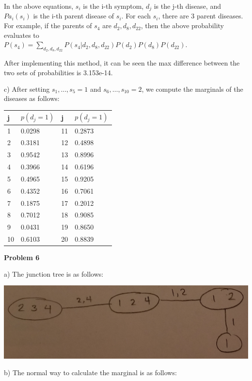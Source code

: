 \documentclass[12pt]{article}
\begin{document}
In the above equations, $s_i$ is the i-th symptom, $d_j$ is the j-th disease, and $Pa_i(s_i)$ is the i-th parent disease of $s_i$. For each $s_i$, there are 3 parent diseases. For example, if the parents of $s_4$ are $d_2, d_8, d_{22}$, then the above probability evaluates to \\$P(s_4) = \sum_{d_2, d_8, d_{22}} P(s_4 \vert d_2, d_8, d_{22})P(d_2)P(d_8)P(d_{22})$.

After implementing this method, it can be seen the max difference between the two sets of probabilities is 3.153e-14.

\pagebreak c) After setting $s_1, \dots, s_5 = 1$ and $s_6, \dots, s_{10} = 2$, we compute the marginals of the diseases as follows:

\begin{table}[h]
	\begin{tabular}{|l|l|l|l|}
		\hline
		j  & $p(d_j = 1)$ & j & $p(d_j = 1)$ \\ \hline
		1  & 0.0298 & 11 & 0.2873 \\ \hline
		2  & 0.3181 & 12 & 0.4898 \\ \hline
		3  & 0.9542 & 13 & 0.8996 \\ \hline
		4  & 0.3966 & 14 & 0.6196 \\ \hline
		5  & 0.4965 & 15 & 0.9205 \\ \hline
		6  & 0.4352 & 16 & 0.7061 \\ \hline
		7  & 0.1875 & 17 & 0.2012 \\ \hline
		8  & 0.7012 & 18 & 0.9085 \\ \hline
		9  & 0.0431 & 19 & 0.8650 \\ \hline
		10 & 0.6103 & 20 & 0.8839 \\ \hline
	\end{tabular}
\end{table}

\pagebreak\textbf{Problem 6}

a) The junction tree is as follows:

\includegraphics[scale=0.4]{q6-junctiontree}

b) The normal way to calculate the marginal is as follows:
\end{document}
